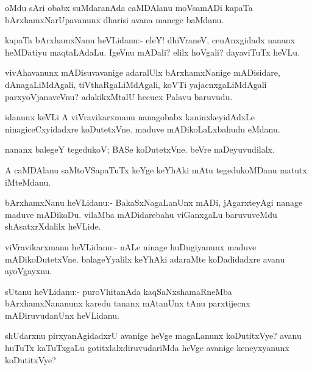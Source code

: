\begin{mng}
oMdu sAri obabx suMdaranAda caMDAlanu moVsamADi kapaTa bArxhamxNarUpavanunx dharisi avana manege baMdanu.
\end{mng}

\begin{mng}
kapaTa bArxhamxNanu heVLidanu:- eleY! dhiVraneV, cenAnxgidadx nananx heMDatiyu maqtaLAdaLu. IgeVnu mADali? elilx hoVgali? dayaviTuTx heVLu.
\end{mng}

\begin{mng}
vivAhavanunx mADisuvavanige adaralUlx bArxhamxNanige mADisidare, dAnagaLiMdAgali, tiVthaRgaLiMdAgali, koVTi yajacnxgaLiMdAgali parxyoVjanaveVnu? adakikxMtalU hecucx Palavu baruvudu.
\end{mng}

\begin{mng}
idanunx keVLi A viVravikarxmanu nanagobabx kaninxkeyidAdxLe ninagiceCxyidadxre koDutetxVne. maduve mADikoLaLxbahudu eMdanu.
\end{mng}

\begin{mng}
nananx balegeY tegedukoV; BASe koDutetxVne. beVre naDeyuvudilalx.
\end{mng}

\begin{mng}
A caMDAlanu saMtoVSapaTuTx keYge keYhAki mAtu tegedukoMDanu matutx iMteMdanu.
\end{mng}

\begin{mng}
bArxhamxNanu heVLidanu:- BakaSxNagaLanUnx mADi, jAgarxteyAgi nanage maduve mADikoDu. vilaMba mADidarebahu viGanxgaLu baruvuveMdu shAsatxrXdalilx heVLide.
\end{mng}

\begin{mng}
viVravikarxmanu heVLidanu:- nALe ninage huDugiyanunx maduve mADikoDutetxVne. balageYyalilx keYhAki adaraMte koDadidadxre avanu ayoVgayxnu.
\end{mng}

\begin{mng}
sUtanu heVLidanu:- puroVhitanAda kaqSaNxshamaRneMba bArxhamxNananunx karedu tananx mAtanUnx tAnu parxtijecnx mADiruvudanUnx heVLidanu.
\end{mng}

\begin{mng}
shUdarxnu pirxyanAgidadxrU avanige heVge magaLanunx koDutitxVye? avanu huTuTx kaTuTxgaLu gotitxlalxdiruvudariMda heVge avanige keneyxyanunx koDutitxVye?
\end{mng}


